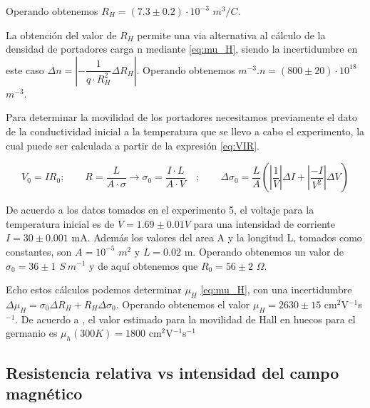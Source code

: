 	\vspace{\baselineskip}
	
	Operando obtenemos $R_H=(7.3\pm0.2)\cdot 10^{-3}$ $m^3/C$. 
	
	\vspace{\baselineskip}
	
	La obtención del valor de $R_H$ permite una via alternativa al cálculo de la densidad de portadores carga n mediante \ref{eq:mu_H}, siendo la incertidumbre en este caso $\Delta n = \left|-\dfrac{1}{q\cdot R_H^2}\Delta R_H\right|$. Operando obtenemos $m^{-3}$.$n=(800\pm20)\cdot 10^{18}$ $m^{-3}$.
	
	\vspace{\baselineskip}
	
	Para determinar la movilidad de los portadores necesitamos previamente el dato de la conductividad inicial a la temperatura que se llevo a cabo el experimento, la cual puede ser calculada a partir de la expresión \ref{eq:VIR}.
	

	\begin{equation} \label{eq:sigma0}
	V_0 = IR_0; \qquad R = \frac{L}{A\cdot\sigma} \rightarrow \boxed{\sigma_0=\frac{I\cdot L}{A\cdot V}} \quad; \qquad \Delta \sigma_0 = \frac{L}{A}\left(\left|
	\frac{1}{V}\right|\Delta I + \left|\frac{-I}{V^2}\right|\Delta V  \right)
	\end{equation} 

	\vspace{\baselineskip}
	
	De acuerdo a los datos tomados en el  experimento 5, el voltaje para la temperatura inicial es de $V=1.69\pm0.01 V$ para una intensidad de corriente $I=30\pm0.001$ mA. Además los valores del area A y la longitud L, tomados como constantes, son $A=10^{-5}$ $m^2$  y $L = 0.02$ m. Operando obtenemos un valor de $\sigma_0 = 36\pm1$ $S\ m^{-1}$ y de aquí obtenemos que $R_0= 56\pm2$ $\Omega$.
	
	\vspace{\baselineskip}
	
	Echo estos cálculos podemos determinar $\mu_H$ \ref{eq:mu_H}, con una incertidumbre $\Delta \mu_H = \sigma_0\Delta R_H + R_H\Delta \sigma_0$. Operando obtenemos el valor $\mu_H = 2630\pm15$ cm$^2$V$^{-1}$s$^{-1}$. De acuerdo a \cite{Madelung2004}, el valor estimado para la movilidad de Hall en huecos para el germanio es   $\mu_h(300 K) = 1800$ cm$^2$V$^{-1}$s$^{-1}$
	
	 
	
	\subsection{Resistencia relativa vs intensidad del campo magnético}	
	
